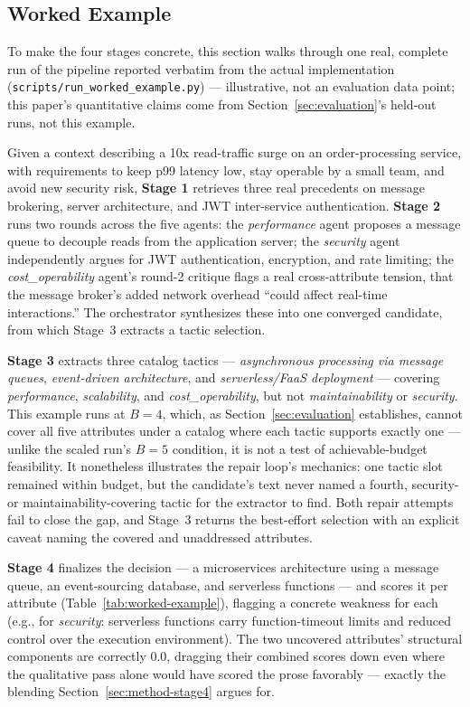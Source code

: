 \documentclass[lettersize,journal]{IEEEtran}
\begin{document}
\subsection{Worked Example}
\label{sec:worked-example}

To make the four stages concrete, this section walks through one real, complete run of the pipeline reported verbatim from the actual implementation (\texttt{scripts/run\_worked\_example.py}) --- illustrative, not an evaluation data point; this paper's quantitative claims come from Section~\ref{sec:evaluation}'s held-out runs, not this example.

Given a context describing a 10x read-traffic surge on an order-processing service, with requirements to keep p99 latency low, stay operable by a small team, and avoid new security risk, \textbf{Stage 1} retrieves three real precedents on message brokering, server architecture, and JWT inter-service authentication. \textbf{Stage 2} runs two rounds across the five agents: the \emph{performance} agent proposes a message queue to decouple reads from the application server; the \emph{security} agent independently argues for JWT authentication, encryption, and rate limiting; the \emph{cost\_operability} agent's round-2 critique flags a real cross-attribute tension, that the message broker's added network overhead ``could affect real-time interactions.'' The orchestrator synthesizes these into one converged candidate, from which Stage~3 extracts a tactic selection.

\textbf{Stage 3} extracts three catalog tactics --- \emph{asynchronous processing via message queues}, \emph{event-driven architecture}, and \emph{serverless/FaaS deployment} --- covering \emph{performance}, \emph{scalability}, and \emph{cost\_operability}, but not \emph{maintainability} or \emph{security}. This example runs at $B=4$, which, as Section~\ref{sec:evaluation} establishes, cannot cover all five attributes under a catalog where each tactic supports exactly one --- unlike the scaled run's $B=5$ condition, it is not a test of achievable-budget feasibility. It nonetheless illustrates the repair loop's mechanics: one tactic slot remained within budget, but the candidate's text never named a fourth, security- or maintainability-covering tactic for the extractor to find. Both repair attempts fail to close the gap, and Stage~3 returns the best-effort selection with an explicit caveat naming the covered and unaddressed attributes.

\textbf{Stage 4} finalizes the decision --- a microservices architecture using a message queue, an event-sourcing database, and serverless functions --- and scores it per attribute (Table~\ref{tab:worked-example}), flagging a concrete weakness for each (e.g., for \emph{security}: serverless functions carry function-timeout limits and reduced control over the execution environment). The two uncovered attributes' structural components are correctly $0.0$, dragging their combined scores down even where the qualitative pass alone would have scored the prose favorably --- exactly the blending Section~\ref{sec:method-stage4} argues for.
\end{document}
